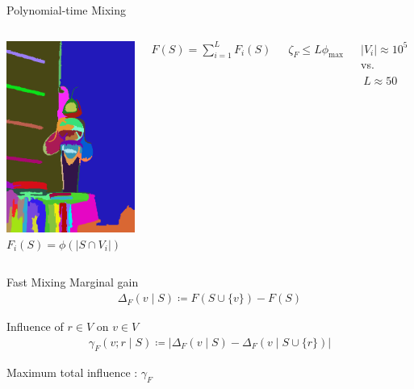 \documentclass[mathserif]{beamer}
\newcommand{\qbox}[1]{%
\begin{tcolorbox}[enhanced jigsaw,size=tight,hbox,boxsep=4pt,boxrule=1pt,coltext=black,colframe=col1light,colback=col1,opacityback=0.7,opacityframe=1]
\strut #1
\end{tcolorbox}%
}
\begin{document}
\begin{frame}{Polynomial-time Mixing}
\vspace{0.5em}
\begin{columns}[c]
\centering
\includegraphics[width=1.85in]{figures/bee_superpixels.png}
$F_i(S) = \phi\left(|S \cap V_i|\right)$

\vspace{1em}
$F(S) = \displaystyle\sum_{i=1}^L F_i(S)$

\vspace{3em}
$\zeta_F \leq L \phi_{\textrm{max}}$

\vspace{3em}
\qbox{
$|V_i| \approx 10^5\ $ vs. $\ L \approx 50$
}
\end{columns}
\end{frame}

\begin{frame}{Fast Mixing}
Marginal gain
\begin{align*}
\Delta_F(v \mid S) \coloneqq F(S \cup \{v\}) - F(S)
\end{align*}

\vspace{1em}
Influence of $r \in V$ on $v \in V$
\begin{align*}
\gamma_F(v; r \mid S) \coloneqq \big|\Delta_F(v \mid S) - \Delta_F(v \mid S \cup \{r\})\big|
\end{align*}

\vspace{1em}
Maximum total influence :\hspace{0.5em} $\gamma_F$
\end{frame}
\end{document}
